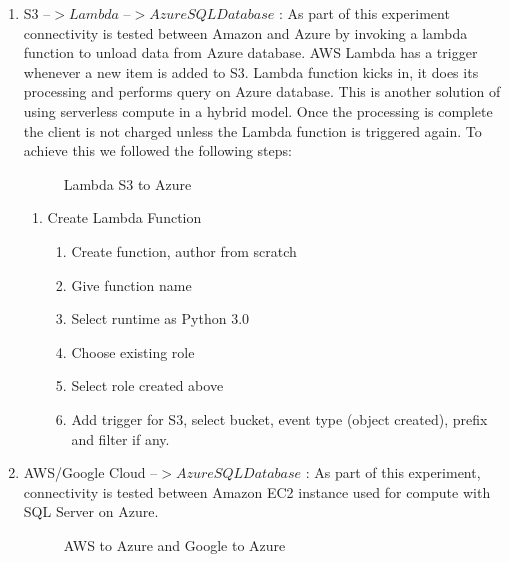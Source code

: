 \documentclass[journal]{hybrid-cloud}
\begin{document}
\begin{enumerate}
\item S3 –\(> Lambda \) –\(> Azure SQL Database \)  : As part of this experiment connectivity is tested between Amazon and Azure by invoking a lambda function to unload data from Azure database.  AWS Lambda has a trigger whenever a new item is added to S3. Lambda function kicks in, it does its processing and performs query on Azure database. This is another solution of using serverless compute in a hybrid model.  Once the processing is complete the client is not charged unless the Lambda function is triggered again. To achieve this we followed the following steps:\cite{ReadCSVFile} 
	
	\begin{figure}[h]
    \caption{\label{fig:S3_Azure} Lambda S3 to Azure}
	\end{figure}


\begin{enumerate}
 \item Create Lambda Function
 \begin{enumerate} 
 	\item Create function, author from scratch
 	\item Give function name
 	\item Select runtime as Python 3.0
 	\item Choose existing role
 	\item Select role created above
 	\item Add trigger for S3, select bucket, event type (object created), prefix and filter if any.
 \end{enumerate}
 \end{enumerate}

	\item AWS/Google Cloud –\(> Azure SQL Database \) : As part of this experiment, connectivity is tested between Amazon EC2 instance used for compute with SQL Server on Azure. 
	
	\begin{figure}[h]	
    	\caption{\label{fig:AWS_Google_AzureDB} AWS to Azure and Google to Azure}
	\end{figure}
	

\end{enumerate}
\end{document}
